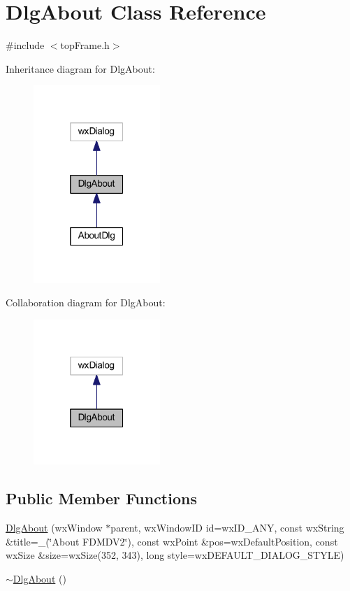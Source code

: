 \hypertarget{class_dlg_about}{\section{Dlg\-About Class Reference}
\label{class_dlg_about}
}


{\ttfamily \#include $<$top\-Frame.\-h$>$}



Inheritance diagram for Dlg\-About\-:\nopagebreak
\begin{figure}[H]
\begin{center}
\leavevmode
\includegraphics[width=136pt]{class_dlg_about__inherit__graph}
\end{center}
\end{figure}


Collaboration diagram for Dlg\-About\-:\nopagebreak
\begin{figure}[H]
\begin{center}
\leavevmode
\includegraphics[width=136pt]{class_dlg_about__coll__graph}
\end{center}
\end{figure}
\subsection*{Public Member Functions}
\begin{DoxyCompactItemize}
\item 
\hyperlink{class_dlg_about_a2d94603323a5f60eff69a92380fb9042}{Dlg\-About} (wx\-Window $\ast$parent, wx\-Window\-I\-D id=wx\-I\-D\-\_\-\-A\-N\-Y, const wx\-String \&title=\-\_\-(\char`\"{}About F\-D\-M\-D\-V2\char`\"{}), const wx\-Point \&pos=wx\-Default\-Position, const wx\-Size \&size=wx\-Size(352, 343), long style=wx\-D\-E\-F\-A\-U\-L\-T\-\_\-\-D\-I\-A\-L\-O\-G\-\_\-\-S\-T\-Y\-L\-E)
\item 
\hyperlink{class_dlg_about_a136aaf6a658ced83c13c058de804ae69}{$\sim$\-Dlg\-About} ()
\end{DoxyCompactItemize}
